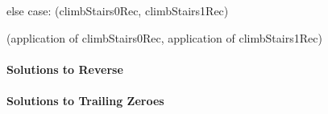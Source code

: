 else case:
(climbStairs0Rec, climbStairs1Rec)

(application of climbStairs0Rec, application of climbStairs1Rec)

%


\paragraph{Solutions to Reverse}
%

\paragraph{Solutions to Trailing Zeroes}

